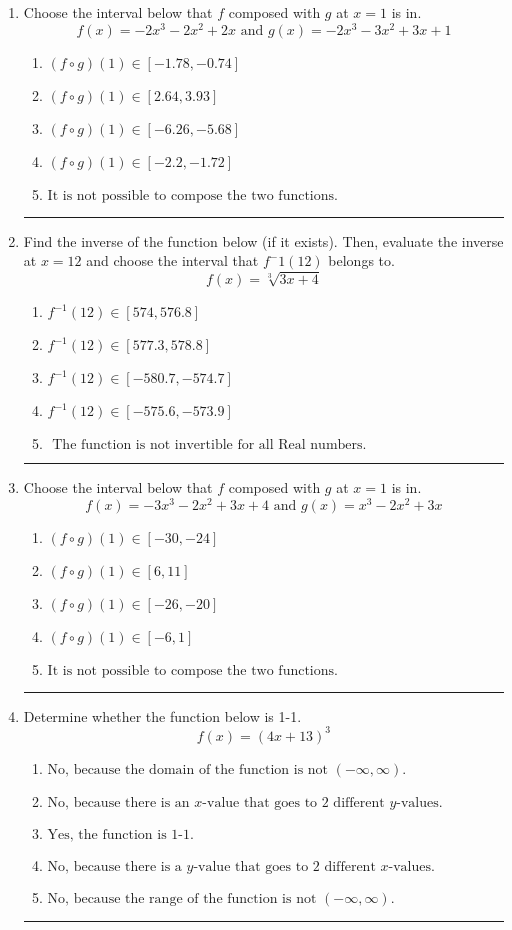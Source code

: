 \documentclass[14pt]{extbook}
\newcommand{\litem}[1]{\item#1\hspace*{-1cm}\rule{\textwidth}{0.4pt}}
\begin{document}
\begin{enumerate}
{\begin{enumerate}[label=\Alph*.]
\end{enumerate} }
\litem{
Choose the interval below that $f$ composed with $g$ at $x=1$ is in.\[ f(x) = -2x^{3} -2 x^{2} +2 x \text{ and } g(x) = -2x^{3} -3 x^{2} +3 x + 1 \]\begin{enumerate}[label=\Alph*.]
\item \( (f \circ g)(1) \in [-1.78, -0.74] \)
\item \( (f \circ g)(1) \in [2.64, 3.93] \)
\item \( (f \circ g)(1) \in [-6.26, -5.68] \)
\item \( (f \circ g)(1) \in [-2.2, -1.72] \)
\item \( \text{It is not possible to compose the two functions.} \)

\end{enumerate} }
\litem{
Find the inverse of the function below (if it exists). Then, evaluate the inverse at $x = 12$ and choose the interval that $f^-1(12)$ belongs to.\[ f(x) = \sqrt[3]{3 x + 4} \]\begin{enumerate}[label=\Alph*.]
\item \( f^{-1}(12) \in [574, 576.8] \)
\item \( f^{-1}(12) \in [577.3, 578.8] \)
\item \( f^{-1}(12) \in [-580.7, -574.7] \)
\item \( f^{-1}(12) \in [-575.6, -573.9] \)
\item \( \text{ The function is not invertible for all Real numbers. } \)

\end{enumerate} }
\litem{
Choose the interval below that $f$ composed with $g$ at $x=1$ is in.\[ f(x) = -3x^{3} -2 x^{2} +3 x + 4 \text{ and } g(x) = x^{3} -2 x^{2} +3 x \]\begin{enumerate}[label=\Alph*.]
\item \( (f \circ g)(1) \in [-30, -24] \)
\item \( (f \circ g)(1) \in [6, 11] \)
\item \( (f \circ g)(1) \in [-26, -20] \)
\item \( (f \circ g)(1) \in [-6, 1] \)
\item \( \text{It is not possible to compose the two functions.} \)

\end{enumerate} }
\litem{
Determine whether the function below is 1-1.\[ f(x) = (4 x + 13)^3 \]\begin{enumerate}[label=\Alph*.]
\item \( \text{No, because the domain of the function is not $(-\infty, \infty)$.} \)
\item \( \text{No, because there is an $x$-value that goes to 2 different $y$-values.} \)
\item \( \text{Yes, the function is 1-1.} \)
\item \( \text{No, because there is a $y$-value that goes to 2 different $x$-values.} \)
\item \( \text{No, because the range of the function is not $(-\infty, \infty)$.} \)

\end{enumerate} }
\end{enumerate}
\end{document}
